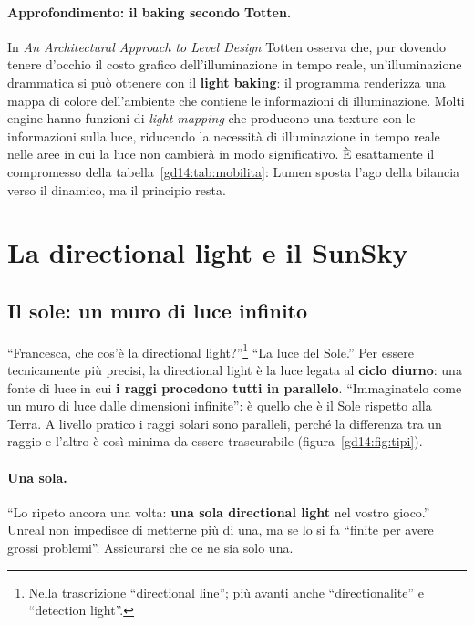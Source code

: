 \paragraph{Approfondimento: il baking secondo Totten.} In \emph{An Architectural
Approach to Level Design} Totten osserva che, pur dovendo tenere d'occhio il costo
grafico dell'illuminazione in tempo reale, un'illuminazione drammatica si può
ottenere con il \textbf{light baking}: il programma renderizza una mappa di colore
dell'ambiente che contiene le informazioni di illuminazione. Molti engine hanno
funzioni di \emph{light mapping} che producono una texture con le informazioni
sulla luce, riducendo la necessità di illuminazione in tempo reale nelle aree in
cui la luce non cambierà in modo significativo. È esattamente il compromesso della
tabella~\ref{gd14:tab:mobilita}: Lumen sposta l'ago della bilancia verso il
dinamico, ma il principio resta.

\section{La directional light e il SunSky}
\label{gd14:sec:directional}



\subsection{Il sole: un muro di luce infinito}

``Francesca, che cos'è la directional light?''\footnote{Nella trascrizione
``directional line''; più avanti anche ``directionalite'' e ``detection light''.}
``La luce del Sole.'' Per essere tecnicamente più precisi, la directional light è
la luce legata al \textbf{ciclo diurno}: una fonte di luce in cui \textbf{i raggi
procedono tutti in parallelo}. ``Immaginatelo come un muro di luce dalle dimensioni
infinite'': è quello che è il Sole rispetto alla Terra. A livello pratico i raggi
solari sono paralleli, perché la differenza tra un raggio e l'altro è così minima
da essere trascurabile (figura~\ref{gd14:fig:tipi}).

\paragraph{Una sola.} ``Lo ripeto ancora una volta: \textbf{una sola directional
light} nel vostro gioco.'' Unreal non impedisce di metterne più di una, ma se lo si
fa ``finite per avere grossi problemi''. Assicurarsi che ce ne sia solo una.

